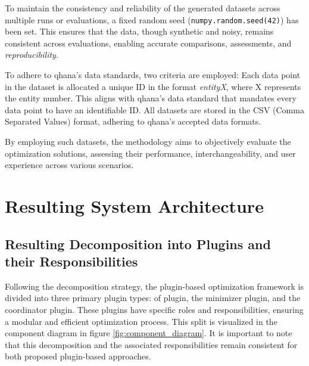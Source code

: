 \documentclass[
  a4paper,  %
  twoside,  %
  bibliography=totoc,
  headsepline,
  cleardoublepage=empty,
  parskip=half,
  draft=false
]{scrbook}
\begin{document}
To maintain the consistency and reliability of the generated datasets across multiple runs or evaluations, a fixed random seed (\texttt{numpy.random.seed(42)}) has been set.
This ensures that the data, though synthetic and noisy, remains consistent across evaluations, enabling accurate comparisons, assessments, and \emph{reproducibility}.

To adhere to \gls{qhana}'s data standards, two criteria are employed:
Each data point in the dataset is allocated a unique ID in the format \emph{entityX}, where X represents the entity number.
This aligns with \gls{qhana}'s data standard that mandates every data point to have an identifiable ID.
All datasets are stored in the CSV (Comma Separated Values) format, adhering to \gls{qhana}'s accepted data formats.


% 



By employing such datasets, the methodology aims to objectively evaluate the optimization solutions, assessing their performance, interchangeability, and user experience across various scenarios.



\chapter{Resulting System Architecture}
\label{chap:architecture}


\section{Resulting Decomposition into Plugins and their Responsibilities}
\label{sec:resdecomposition}

Following the decomposition strategy, the plugin-based optimization framework is divided into three primary plugin types:
\gls{of} plugin, the minimizer plugin, and the coordinator plugin.
These plugins have specific roles and responsibilities, ensuring a modular and efficient optimization process.
This split is visualized in the component diagram in figure \ref{fig:component_diagram}.
It is important to note that this decomposition and the associated responsibilities remain consistent for both proposed plugin-based approaches.
\end{document}
